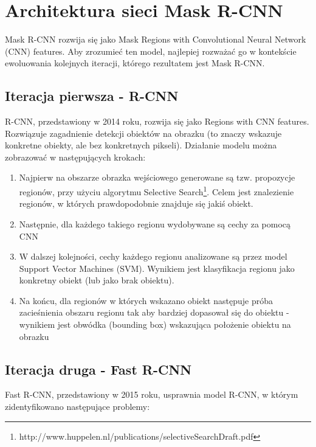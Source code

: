 \section{Architektura sieci Mask R-CNN}
\label{sec:architekrura_mask_rcnn}

Mask R-CNN rozwija się jako Mask Regions with Convolutional Neural Network (CNN) features. Aby zrozumieć ten model, najlepiej rozważać go w kontekście ewoluowania kolejnych iteracji, którego rezultatem jest Mask R-CNN.

\subsection{Iteracja pierwsza - R-CNN}


R-CNN, przedstawiony w 2014 roku, rozwija się jako Regions with CNN features. Rozwiązuje zagadnienie detekcji obiektów na obrazku (to znaczy wskazuje konkretne obiekty, ale bez konkretnych pikseli). Działanie modelu można zobrazować w następujących krokach:

\begin{enumerate}
	\item Najpierw na obszarze obrazka wejściowego generowane są tzw. propozycje regionów, przy użyciu algorytmu Selective Search\footnote{http://www.huppelen.nl/publications/selectiveSearchDraft.pdf}. Celem jest znalezienie regionów, w których prawdopodobnie znajduje się jakiś obiekt.
	\item Następnie, dla każdego takiego regionu wydobywane są cechy za pomocą CNN
	\item W dalszej kolejności, cechy każdego regionu analizowane są przez model Support Vector Machines (SVM). Wynikiem jest klasyfikacja regionu jako konkretny obiekt (lub jako brak obiektu).
	\item Na końcu, dla regionów w których wskazano obiekt następuje próba zacieśnienia obszaru regionu tak aby bardziej dopasował się do obiektu - wynikiem jest obwódka (bounding box) wskazująca położenie obiektu na obrazku
\end{enumerate}

\subsection{Iteracja druga - Fast R-CNN}


Fast R-CNN, przedstawiony w 2015 roku, usprawnia model R-CNN, w którym zidentyfikowano następujące problemy:

